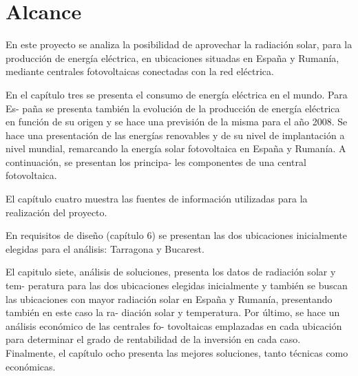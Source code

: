\chapter{Alcance}

En este proyecto se analiza la posibilidad de aprovechar la radiación solar, para la producción de energía eléctrica, en ubicaciones situadas en España y Rumanía, mediante centrales fotovoltaicas conectadas con la red eléctrica.

En el capítulo tres se presenta el consumo de energía eléctrica en el mundo. Para Es- paña se presenta también la evolución de la producción de energía eléctrica en función de su origen y se hace una previsión de la misma para el año 2008. Se hace una presentación de las energías renovables y de su nivel de implantación a nivel mundial, remarcando la energía solar fotovoltaica en España y Rumanía. A continuación, se presentan los principa- les componentes de una central fotovoltaica.

El capítulo cuatro muestra las fuentes de información utilizadas para la realización del proyecto.

En requisitos de diseño (capítulo 6) se presentan las dos ubicaciones inicialmente elegidas para el análisis: Tarragona y Bucarest.

El capitulo siete, análisis de soluciones, presenta los datos de radiación solar y tem- peratura para las dos ubicaciones elegidas inicialmente y también se buscan las ubicaciones con mayor radiación solar en España y Rumanía, presentando también en este caso la ra- diación solar y temperatura. Por último, se hace un análisis económico de las centrales fo- tovoltaicas emplazadas en cada ubicación para determinar el grado de rentabilidad de la inversión en cada caso. Finalmente, el capítulo ocho presenta las mejores soluciones, tanto técnicas como económicas.
